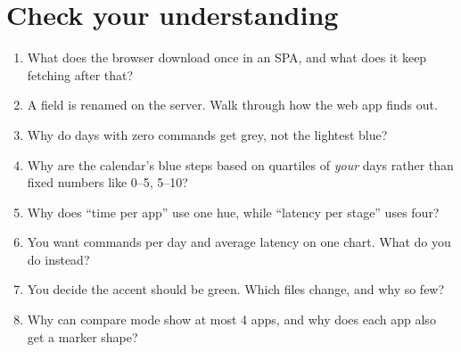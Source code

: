 \documentclass[11pt,a4paper]{article}
\begin{document}
\section{Check your understanding}
\begin{exercise}
\begin{enumerate}
  \item What does the browser download once in an SPA, and what does it keep fetching after that?
  \item A field is renamed on the server. Walk through how the web app finds out.
  \item Why do days with zero commands get grey, not the lightest blue?
  \item Why are the calendar's blue steps based on quartiles of \emph{your} days rather than fixed
        numbers like 0--5, 5--10?
  \item Why does ``time per app'' use one hue, while ``latency per stage'' uses four?
  \item You want commands per day and average latency on one chart. What do you do instead?
  \item You decide the accent should be green. Which files change, and why so few?
  \item Why can compare mode show at most 4 apps, and why does each app also get a marker shape?
\end{enumerate}
\end{exercise}
\end{document}
